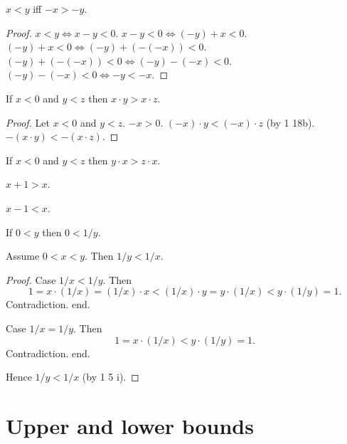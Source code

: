 \documentclass{article}
\begin{document}
\begin{forthel}
\begin{proposition}
$x < y$ iff $-x > -y$.
\end{proposition}
\begin{proof}
$x < y \iff x - y < 0$.
$x - y < 0 \iff (-y) + x < 0$.
$(-y) + x < 0 \iff (-y)+(-(-x)) < 0$.
$(-y)+(-(-x)) < 0 \iff (-y)-(-x) < 0$.
$(-y)-(-x) < 0 \iff -y < -x$.
\end{proof}

\begin{proposition}[1 18 c]
If $x < 0$ and $y < z$ then
$x \cdot y > x \cdot z$.
\end{proposition}
\begin{proof}
Let $x < 0$ and $y < z$.
$-x > 0$.
$(-x)\cdot y < (-x)\cdot z$ (by 1 18b).
$-(x\cdot y) < -(x\cdot z)$.
\end{proof}

\begin{proposition}[1 18 cc]
If $x < 0$ and $y < z$ then
$y \cdot x > z \cdot x$.
\end{proposition}

\begin{proposition}
$x + 1 > x$.
\end{proposition}

\begin{proposition}
$x - 1 < x$.
\end{proposition}

\begin{proposition}[1 18 e]
If $0 < y$ then $0 < 1/y$.
\end{proposition}

\begin{proposition}[1 18 ee]
Assume $0 < x < y$.
Then $1/y < 1/x$.
\end{proposition}
\begin{proof}
Case $1/x < 1/y$.
Then
\[ 1 = x \cdot (1/x) = (1/x) \cdot x < (1/x) \cdot y =
y \cdot (1/x) < y \cdot (1/y) = 1. \]
Contradiction. end.

Case $1/x = 1/y$. Then
\[ 1 = x \cdot (1/x) < y \cdot (1/y) = 1. \]
Contradiction. end.

Hence $1/y < 1/x$ (by 1 5 i).
\end{proof}

\end{forthel}


\section{Upper and lower bounds}
\end{document}
